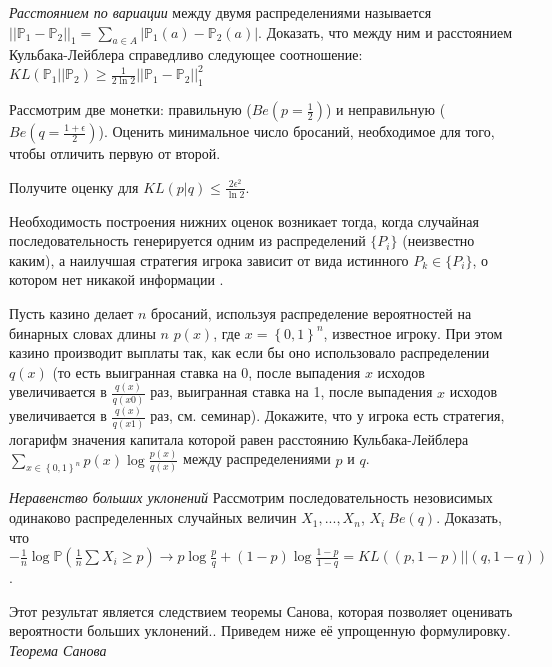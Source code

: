 \begin{problem} 
\textit{Расстоянием по вариации} между двумя распределениями называется $||\mathbb{P}_1 - \mathbb{P}_2||_1 = \sum_{a \in A} |\mathbb{P}_1(a) - \mathbb{P}_2(a)|$. Доказать, что между ним и расстоянием Кульбака-Лейблера справедливо следующее соотношение:\\
$KL(\mathbb{P}_1||\mathbb{P}_2) \geq \frac{1}{2\ln2} ||\mathbb{P}_1 - \mathbb{P}_2||_1^2$
\end{problem}

\begin{problem}
Рассмотрим две монетки: правильную ($Be(p = \frac{1}{2})$) и неправильную ($Be(q = \frac{1 +\epsilon}{2})$). Оценить минимальное число бросаний, необходимое для того, чтобы отличить первую от второй.
\begin{ordre}
Получите оценку для $KL(p|q) \leq \frac{2\epsilon^2}{\ln 2}$.
\end{ordre}
\end{problem}

\begin{remark} Необходимость построения нижних оценок возникает тогда, когда случайная последовательность генерируется одним из распределений $\{P_i\}$ (неизвестно каким), а наилучшая стратегия игрока зависит от вида истинного $P_k \in \{P_i\}$, о котором нет никакой информации  . 
\end{remark}

\begin{problem}
Пусть казино делает $n$ бросаний, используя распределение вероятностей на бинарных словах длины $n$ $p\left(x\right)$, где $x=\left\{0,1\right\}^{n} $, известное игроку. При этом казино производит выплаты так, как если бы оно использовало распределении $q\left(x\right)$ (то есть выигранная ставка на 0, после выпадения $x$ исходов увеличивается в $\frac{q\left(x\right)}{q\left(x0\right)} $ раз, выигранная ставка на 1, после выпадения $x$ исходов увеличивается в $\frac{q\left(x\right)}{q\left(x1\right)} $ раз, см. семинар). Докажите, что у игрока есть стратегия, логарифм значения капитала которой равен расстоянию Кульбака-Лейблера $\sum _{x\in \left\{0,1\right\}^{n} }p\left(x\right)\log \frac{p\left(x\right)}{q\left(x\right)}  $ между распределениями $p$ и $q$.
\end{problem}


\begin{problem} \textit{Неравенство больших уклонений}
Рассмотрим последовательность незовисимых одинаково распределенных случайных величин $X_1, ..., X_n$, $X_i~Be(q)$. Доказать, что $-\frac{1}{n}\log \mathbb{P}(\frac{1}{n}\sum X_i \geq p) \rightarrow p\log \frac{p}{q} + (1-p)\log \frac{1-p}{1-q} = KL((p, 1-p)||(q, 1-q))$.
\begin{ordre}
\end{ordre}
\end{problem}

\begin{remark} 
Этот результат является следствием теоремы Санова, которая позволяет оценивать вероятности больших уклонений.. Приведем ниже её упрощенную формулировку.\\
\textit{Теорема Санова}
\end{remark}

